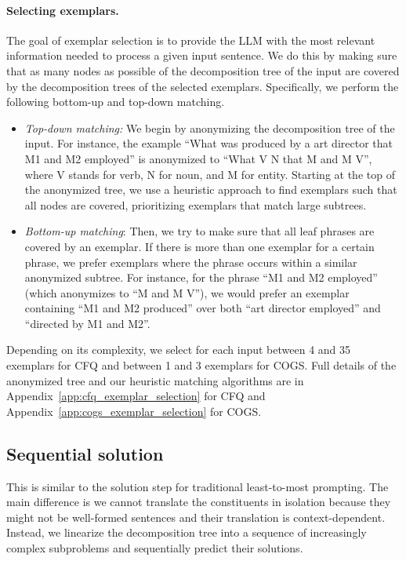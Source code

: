 \documentclass{article} \usepackage{iclr2022_conference,times}
\begin{document}
\paragraph{Selecting exemplars.}
The goal of exemplar selection is to provide the LLM with the most relevant information needed to process a given input sentence. We do this by making sure that as many nodes as possible of the decomposition tree of the input are covered by the decomposition trees of the selected exemplars. Specifically, we perform the following bottom-up and top-down matching.

\begin{itemize}
    \item \textit{Top-down matching:} 
    We begin by anonymizing the decomposition tree of the input. For instance, the example ``What was produced by a art director that M1 and M2 employed'' is anonymized to ``What V N that M and M V'', where V stands for verb, N for noun, and M for entity. Starting at the top of the anonymized tree, we use a heuristic approach to find exemplars such that all nodes are covered, prioritizing exemplars that match large subtrees.
    
    \item \textit{Bottom-up matching}:
    Then, we try to make sure that all leaf phrases are covered by an exemplar. If there is more than one exemplar for a certain phrase, we prefer exemplars where the phrase occurs within a similar anonymized subtree. For instance, for the phrase ``M1 and M2 employed'' (which anonymizes to ``M and M V''), we would prefer an exemplar containing ``M1 and M2 produced'' over both ``art director employed''  and ``directed by M1 and M2''.
    
\end{itemize}

Depending on its complexity, we select for each input between 4 and 35 exemplars for CFQ and between 1 and 3 exemplars for COGS. Full details of the anonymized tree and our heuristic matching algorithms are in Appendix~\ref{app:cfq_exemplar_selection} for CFQ and Appendix~\ref{app:cogs_exemplar_selection} for COGS.
 
\subsection{Sequential solution}
\label{sec:seq_solution}

This is similar to the solution step for traditional least-to-most prompting. The main difference is we cannot translate the constituents in isolation because they might not be well-formed sentences and their translation  is context-dependent. Instead, we linearize the decomposition tree into a sequence of increasingly complex subproblems and sequentially predict their solutions. 
\end{document}
